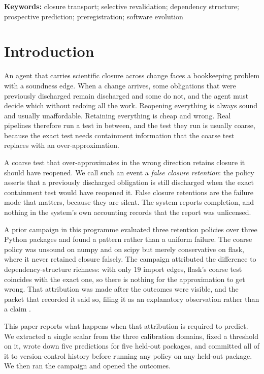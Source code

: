 \documentclass[11pt]{article}
\begin{document}
\noindent\textbf{Keywords:} closure transport; selective revalidation; dependency structure; prospective prediction; preregistration; software evolution

\section{Introduction}
An agent that carries scientific closure across change faces a bookkeeping problem with a soundness edge. When a change arrives, some obligations that were previously discharged remain discharged and some do not, and the agent must decide which without redoing all the work. Reopening everything is always sound and usually unaffordable. Retaining everything is cheap and wrong. Real pipelines therefore run a test in between, and the test they run is usually coarse, because the exact test needs containment information that the coarse test replaces with an over-approximation.

A coarse test that over-approximates in the wrong direction retains closure it should have reopened. We call such an event a \emph{false closure retention}: the policy asserts that a previously discharged obligation is still discharged when the exact containment test would have reopened it. False closure retentions are the failure mode that matters, because they are silent. The system reports completion, and nothing in the system's own accounting records that the report was unlicensed.

A prior campaign in this programme evaluated three retention policies over three Python packages and found a pattern rather than a uniform failure. The coarse policy was unsound on numpy and on scipy but merely conservative on flask, where it never retained closure falsely. The campaign attributed the difference to dependency-structure richness: with only $19$ import edges, flask's coarse test coincides with the exact one, so there is nothing for the approximation to get wrong. That attribution was made after the outcomes were visible, and the packet that recorded it said so, filing it as an explanatory observation rather than a claim \cite{orion17chain}.

This paper reports what happens when that attribution is required to predict. We extracted a single scalar from the three calibration domains, fixed a threshold on it, wrote down five predictions for five held-out packages, and committed all of it to version-control history before running any policy on any held-out package. We then ran the campaign and opened the outcomes.
\end{document}
